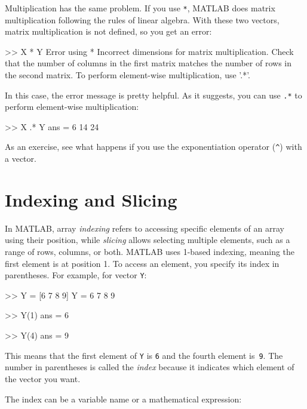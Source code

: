 Multiplication has the same problem.  If you use \lstinline{*}, MATLAB does matrix multiplication following the rules of linear algebra.  With these two vectors, matrix multiplication is not defined, so you get an error:

\begin{code}
>> X * Y
Error using  *
Incorrect dimensions for matrix multiplication.
Check that the number of columns in the first matrix
matches the number of rows in the second matrix.
To perform element-wise multiplication, use '.*'.
\end{code}

In this case, the error message is pretty helpful.  As it suggests, you can use \lstinline{.*} to perform element-wise multiplication:


\begin{code}
>> X .* Y
ans = 6    14    24
\end{code}

As an exercise, see what happens if you use the exponentiation operator
(\lstinline{^}) with a vector.

\section{Indexing and Slicing}

In MATLAB, array \emph{indexing} refers to accessing specific elements of an array using their position, while \emph{slicing} allows selecting multiple elements, such as a range of rows, columns, or both.  MATLAB uses 1-based indexing, meaning the first element is at position 1. To access an element, you specify its index in parentheses. For example, for vector \lstinline{Y}:



\begin{code}
>> Y = [6 7 8 9]
Y = 6    7     8     9

>> Y(1)
ans = 6

>> Y(4)
ans = 9
\end{code}

This means that the first element of \lstinline{Y} is \lstinline{6} and the
fourth element is~\lstinline{9}.  
The number in parentheses is called the \emph{index} because it indicates which element of the vector you want.


The index can be a variable name or a mathematical expression:

